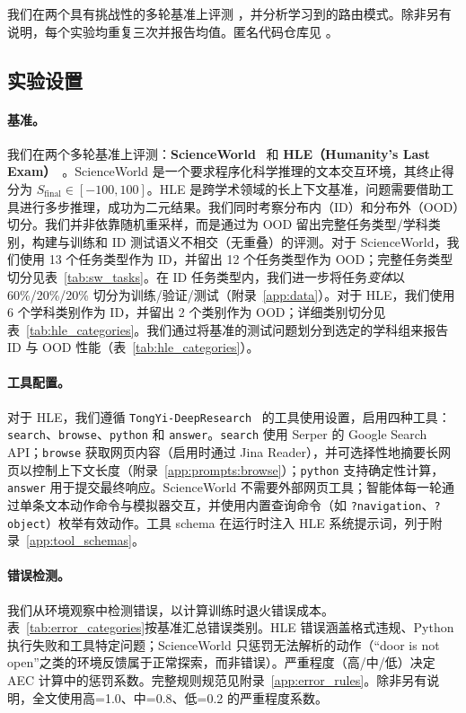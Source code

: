 我们在两个具有挑战性的多轮基准上评测 \method，并分析学习到的路由模式。除非另有说明，每个实验均重复三次并报告均值。匿名代码仓库见 \github。

\subsection{实验设置}

\paragraph{基准。}
我们在两个多轮基准上评测：\textbf{ScienceWorld}~\citep{wang2022scienceworld} 和 \textbf{HLE（Humanity's Last Exam）}~\citep{phan2025humanitysexam}。ScienceWorld 是一个要求程序化科学推理的文本交互环境，其终止得分为 $S_{\text{final}} \in [-100, 100]$。HLE 是跨学术领域的长上下文基准，问题需要借助工具进行多步推理，成功为二元结果。我们同时考察分布内（ID）和分布外（OOD）切分。我们并非依靠随机重采样，而是通过为 OOD 留出完整任务类型/学科类别，构建与训练和 ID 测试语义不相交（无重叠）的评测。对于 ScienceWorld，我们使用 13 个任务类型作为 ID，并留出 12 个任务类型作为 OOD；完整任务类型切分见表~\ref{tab:sw_tasks}。在 ID 任务类型内，我们进一步将任务\emph{变体}以 60\%/20\%/20\% 切分为训练/验证/测试（附录~\ref{app:data}）。对于 HLE，我们使用 6 个学科类别作为 ID，并留出 2 个类别作为 OOD；详细类别切分见表~\ref{tab:hle_categories}。我们通过将基准的测试问题划分到选定的学科组来报告 ID 与 OOD 性能（表~\ref{tab:hle_categories}）。

\paragraph{工具配置。}
对于 HLE，我们遵循 \texttt{TongYi-DeepResearch}~\citep{team2025tongyi} 的工具使用设置，启用四种工具：\texttt{search}、\texttt{browse}、\texttt{python} 和 \texttt{answer}。\texttt{search} 使用 Serper 的 Google Search API；\texttt{browse} 获取网页内容（启用时通过 Jina Reader），并可选择性地摘要长网页以控制上下文长度（附录~\ref{app:prompts:browse}）；\texttt{python} 支持确定性计算，\texttt{answer} 用于提交最终响应。ScienceWorld 不需要外部网页工具；智能体每一轮通过单条文本动作命令与模拟器交互，并使用内置查询命令（如 \texttt{?navigation}、\texttt{?object}）枚举有效动作。工具 schema 在运行时注入 HLE 系统提示词，列于附录~\ref{app:tool_schemas}。

\paragraph{错误检测。}
我们从环境观察中检测错误，以计算训练时退火错误成本。表~\ref{tab:error_categories}按基准汇总错误类别。HLE 错误涵盖格式违规、Python 执行失败和工具特定问题；ScienceWorld 只惩罚无法解析的动作（“door is not open”之类的环境反馈属于正常探索，而非错误）。严重程度（高/中/低）决定 AEC 计算中的惩罚系数。完整规则规范见附录~\ref{app:error_rules}。除非另有说明，全文使用高=1.0、中=0.8、低=0.2 的严重程度系数。

